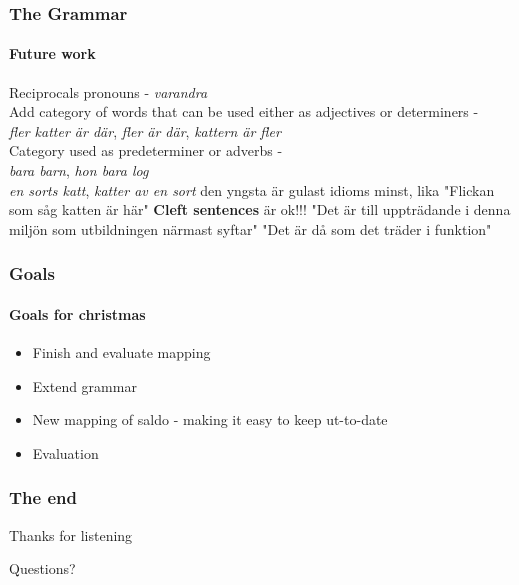 \documentclass[10pt]{beamer}
\begin{document}
\begin{frame}
\frametitle{The Grammar}
\framesubtitle{Future work} 
Reciprocals pronouns - \emph{varandra} \\
Add category of words that can be used either as adjectives or determiners - \\
   \emph{fler katter är där}, \emph{fler är där}, \emph{kattern är fler}\\ %
Category used as predeterminer or adverbs - \\
  \emph{bara barn}, \emph{hon bara log} \\
\emph{en sorts katt}, \emph{katter av en sort}
den yngsta är gulast
idioms
minst, lika
"Flickan som såg katten är här"
\textbf{Cleft sentences} är ok!!!
"Det är till uppträdande i denna miljön som utbildningen närmast syftar"
"Det är då som det träder i funktion"
\end{frame}
\begin{frame}
\frametitle{Goals}
\framesubtitle{Goals for christmas} 
\begin{itemize}
\item{Finish and evaluate mapping}
\item{Extend grammar}
    \item{New mapping of saldo - making it easy to keep ut-to-date}
\item{Evaluation}
\end{itemize}
\end{frame}

\begin{frame}
    \frametitle{The end}
\huge\begin{center}Thanks for listening\end{center}
\large\begin{center}Questions?\end{center}
\end{frame}
\end{document}

